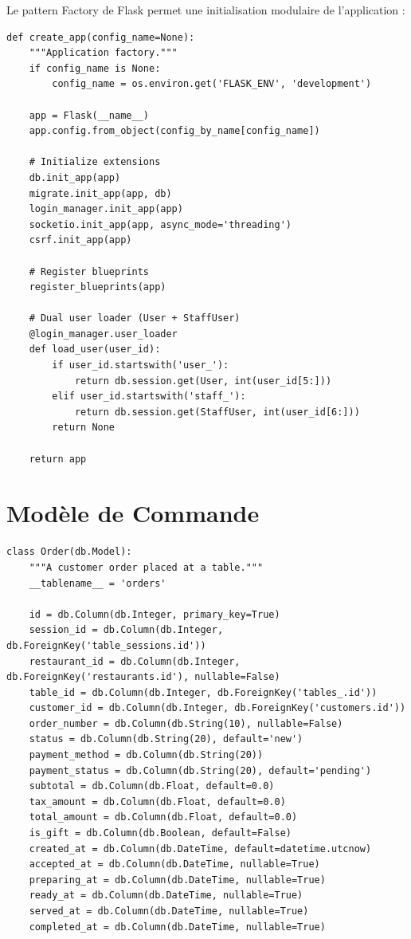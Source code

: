 \documentclass[12pt,a4paper]{report}
\begin{document}
Le pattern Factory de Flask permet une initialisation modulaire de l'application :

\begin{lstlisting}[caption={Application Factory -- \texttt{app/\_\_init\_\_.py}}]
def create_app(config_name=None):
    """Application factory."""
    if config_name is None:
        config_name = os.environ.get('FLASK_ENV', 'development')

    app = Flask(__name__)
    app.config.from_object(config_by_name[config_name])

    # Initialize extensions
    db.init_app(app)
    migrate.init_app(app, db)
    login_manager.init_app(app)
    socketio.init_app(app, async_mode='threading')
    csrf.init_app(app)

    # Register blueprints
    register_blueprints(app)
    
    # Dual user loader (User + StaffUser)
    @login_manager.user_loader
    def load_user(user_id):
        if user_id.startswith('user_'):
            return db.session.get(User, int(user_id[5:]))
        elif user_id.startswith('staff_'):
            return db.session.get(StaffUser, int(user_id[6:]))
        return None

    return app
\end{lstlisting}

\section{Modèle de Commande}

\begin{lstlisting}[caption={Modèle Order -- \texttt{app/models/order.py}}]
class Order(db.Model):
    """A customer order placed at a table."""
    __tablename__ = 'orders'

    id = db.Column(db.Integer, primary_key=True)
    session_id = db.Column(db.Integer, db.ForeignKey('table_sessions.id'))
    restaurant_id = db.Column(db.Integer, db.ForeignKey('restaurants.id'), nullable=False)
    table_id = db.Column(db.Integer, db.ForeignKey('tables_.id'))
    customer_id = db.Column(db.Integer, db.ForeignKey('customers.id'))
    order_number = db.Column(db.String(10), nullable=False)
    status = db.Column(db.String(20), default='new')
    payment_method = db.Column(db.String(20))
    payment_status = db.Column(db.String(20), default='pending')
    subtotal = db.Column(db.Float, default=0.0)
    tax_amount = db.Column(db.Float, default=0.0)
    total_amount = db.Column(db.Float, default=0.0)
    is_gift = db.Column(db.Boolean, default=False)
    created_at = db.Column(db.DateTime, default=datetime.utcnow)
    accepted_at = db.Column(db.DateTime, nullable=True)
    preparing_at = db.Column(db.DateTime, nullable=True)
    ready_at = db.Column(db.DateTime, nullable=True)
    served_at = db.Column(db.DateTime, nullable=True)
    completed_at = db.Column(db.DateTime, nullable=True)
\end{lstlisting}
\end{document}
